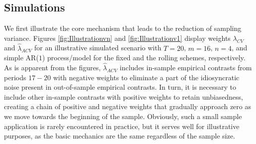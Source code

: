 \documentclass[11pt,dvipsnames]{article}
\begin{document}
\subsection{Simulations}\label{Simulations}
We first illustrate the core mechanism that leads to the reduction of sampling variance. Figures \ref{fig:Illustrationvn} and \ref{fig:Illustrationv1} display weights $ \lambda_{CV} $ and $ \widehat{\lambda}_{ACV} $ for an illustrative simulated scenario with $ T=20 $, $ m=16 $, $ n=4 $, and simple AR($ 1 $) process/model for the fixed and the rolling schemes, respectively. As is apparent from the figures, $ \widehat{\lambda}_{ACV} $ includes in-sample empirical contrasts from periods $ 17-20 $ with negative weights to eliminate a part of the idiosyncratic noise present in out-of-sample empirical contrasts. In turn, it is necessary to include other in-sample contrasts with positive weights to retain unbiasedness, creating a chain of positive and negative weights that gradually approach zero as we move towards the beginning of the sample. Obviously, such a small sample application is rarely encountered in practice, but it serves well for illustrative purposes, as the basic mechanics are the same regardless of the sample size.
\end{document}
